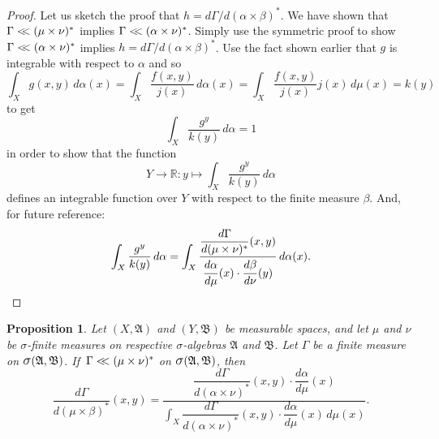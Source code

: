 \documentclass[
twoside=true,
paper=letter,
fontsize=9pt,
pagesize=auto,
leqno,
openany,
headsepline,
overfullrule,
]{scrbook}
\theoremstyle{plain}
\theoremstyle{plain}
\newtheorem{prop}[thm]{Proposition}
\theoremstyle{definition}
\theoremstyle{bfnoteitalic}
\theoremstyle{bfnoteroman}
\newcommand{\sigalg}[1]{\mathfrak{#1}}
\newcommand{\sagb}{\mathop{\hbox{\large{$\sigma$}}}\nolimits}
\newcommand{\textsigma}{\hbox{\large{$\sigma$}}\kern-1pt}
\newcommand{\R}{\mathbb{R}}
\newcommand{\sigmaalgebra}{\sigalg{A}}
\newcommand{\sigmaalgebraii}{\sigalg{B}}
\newcommand{\productsig}[2]{\sagb(#1,#2)}
\newcommand{\lilstrut}{\vphantom{\bigl(}}
\newcommand{\funcf}{f}
\newcommand{\funcg}{g}
\newcommand{\funcj}{j}
\newcommand{\funck}{k}
\newcommand{\functioniii}{h}
\newcommand{\measurespace}{X}
\newcommand{\measurespaceii}{Y}
\newcommand{\mspaceelt}{x}
\newcommand{\mspaceeltii}{y}
\newcommand{\abscont}{\mathrel{< \kern-3.5pt <}}
\newcommand{\measure}{\mu}
\newcommand{\measmu}{\mu}
\newcommand{\measureii}{\nu}
\newcommand{\measnu}{\nu}
\newcommand{\joint}{\Gamma}%
\newcommand{\measonprod}{\Gamma}%
\newcommand{\marginalone}{\alpha}%
\newcommand{\marginaltwo}{\beta}%
\begin{document}
\begin{proof}
Let us sketch the proof that
$\functioniii
=
d\measonprod / d(\marginalone\times\marginaltwo)^*$.
We have shown that 
$\measonprod \abscont (\measure\times\measureii)^*$
implies
$\measonprod \abscont (\marginalone\times\measureii)^*$. 
Simply use the symmetric proof to show 
$\measonprod \abscont (\marginalone\times\measureii)^*$
implies
$\functioniii
=
d\measonprod / d(\marginalone\times\marginaltwo)^*$.
Use the fact shown earlier that 
$\funcg$ is integrable with respect to $\marginalone$ and so
\[
\int_\measurespace\funcg(\mspaceelt,\mspaceeltii)\,d\marginalone(\mspaceelt)
=
\int_\measurespace
\frac{\funcf(\mspaceelt,\mspaceeltii)}{\funcj(\mspaceelt)}
\,d\marginalone(\mspaceelt)
=
\int_\measurespace
\frac{\funcf(\mspaceelt,\mspaceeltii)}{\funcj(\mspaceelt)}
\funcj(\mspaceelt)
\,d\measure(\mspaceelt)
=
\funck(\mspaceeltii)
\]
to get
\[
\int_\measurespace
\frac{\funcg^\mspaceeltii}{\funck(\mspaceeltii)}
\, d\marginalone
= 1
\]
in order to show that the function 
\[
\measurespaceii\to\R :
\mspaceeltii\mapsto
\int_\measurespace
\frac{\funcg^\mspaceeltii}{\funck(\mspaceeltii)}
\, d\marginalone
\]
defines an integrable function over $\measurespaceii$ with respect to the finite measure $\marginaltwo$.
And, for future reference:
\[
\int_\measurespace
\frac{\funcg^\mspaceeltii}{\funck(\mspaceeltii)}
\, d\marginalone
=
\int_\measurespace
\frac{\dfrac{d\joint}{d(\measmu\times\measnu)^*}
(\mspaceelt,\mspaceeltii)}
{\dfrac{d\marginalone\lilstrut}{d\measmu}(\mspaceelt)
\cdot
\dfrac{d\marginaltwo\lilstrut}{d\measnu}(\mspaceeltii)}
\,d\marginalone(\mspaceelt).
\]
\end{proof}



\begin{prop}\label{bayes_rule}
Let
$(\measurespace, \sigmaalgebra)$
and
$(\measurespaceii, \sigmaalgebraii)$
be measurable spaces, and let $\measure$ and $\measureii$
be \textsigma-finite measures on respective \textsigma-algebras
$\sigmaalgebra$ and $\sigmaalgebraii$.
Let $\measonprod$ be a finite measure on
$\productsig{\sigmaalgebra}{\sigmaalgebraii}$.
If $\,\measonprod \abscont (\measure\times\measureii)^*$ on
$\productsig{\sigmaalgebra}{\sigmaalgebraii}$,
then
\[
\dfrac{d\joint}{d(\measmu\times\marginaltwo)^*}(\mspaceelt,\mspaceeltii)
=
\dfrac{
\dfrac{d\joint}{d(\marginalone\times\measnu)^*}(\mspaceelt,\mspaceeltii)
\cdot
\dfrac{d\marginalone}{d\measmu}(\mspaceelt)
}
{
\displaystyle\int_\measurespace
\dfrac{d\joint}{d(\marginalone\times\measnu)^*}(\mspaceelt,\mspaceeltii)
\cdot
\dfrac{d\marginalone}{d\measmu}(\mspaceelt)\,
d\measmu(\mspaceelt)
}.
\]
\end{prop}
\end{document}
